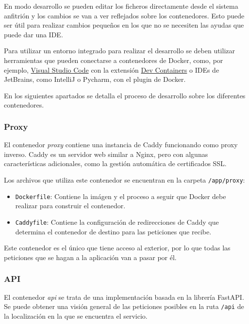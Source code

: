 En modo desarrollo se pueden editar los ficheros directamente desde el sistema
anfitrión y los cambios se van a ver reflejados sobre los contenedores. Esto
puede ser útil para realizar cambios pequeños en los que no se necesiten las
ayudas que puede dar una IDE.

Para utilizar un entorno integrado para realizar el desarrollo se deben utilizar
herramientas que pueden conectarse a contenedores de Docker, como, por ejemplo,
\href{https://code.visualstudio.com/}{Visual Studio Code} con la extensión
\href{https://marketplace.visualstudio.com/items?itemName=ms-vscode-remote.remote-containers}{Dev
Containers} o IDEs de JetBrains, como IntelliJ o Pycharm, con el plugin de
Docker.

En los siguientes apartados se detalla el proceso de desarrollo sobre los
diferentes contenedores.

\subsubsection{Proxy}

El contenedor \textit{proxy} contiene una instancia de Caddy funcionando como
proxy inverso. Caddy es un servidor web similar a Nginx, pero con algunas
características adicionales, como la gestión automática de certificados SSL.

Los archivos que utiliza este contenedor se encuentran en la carpeta
\texttt{/app/proxy}:

\begin{itemize}
    \item \texttt{Dockerfile}: Contiene la imágen y el proceso a seguir que
          Docker debe realizar para construir el contenedor.
    \item \texttt{Caddyfile}: Contiene la configuración de redirecciones de
          Caddy que determina el contenedor de destino para las peticiones que
          recibe.
\end{itemize}

Este contenedor es el único que tiene acceso al exterior, por lo que todas las
peticiones que se hagan a la aplicación van a pasar por él.

\subsubsection{API}

El contenedor \textit{api} se trata de una implementación basada en la librería
FastAPI. Se puede obtener una visión general de las peticiones posibles en la
ruta \texttt{/api} de la localización en la que se encuentra el servicio.

